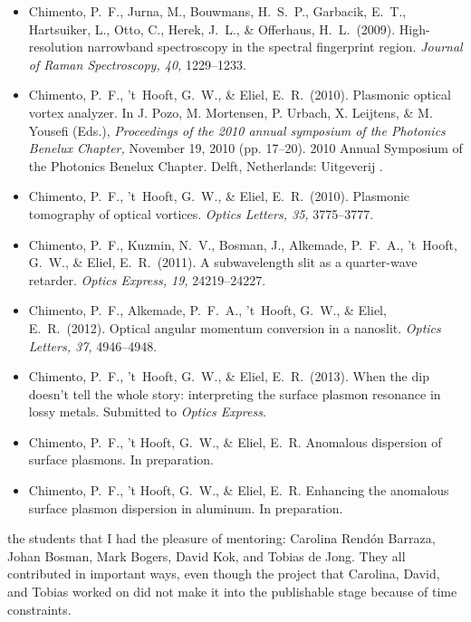 {\raggedright
\begin{itemize}
\item Chimento, P.~F., Jurna, M., Bouwmans, H.~S.~P., Garbacik, E.~T., Hartsuiker, L., Otto, C., Herek, J.~L., \& Offerhaus, H.~L.\ (2009). High-resolution narrowband  spectroscopy in the spectral fingerprint region. \emph{Journal of Raman Spectroscopy, 40,} 1229--1233.
\item Chimento, P.~F., 't~Hooft, G.~W., \& Eliel, E.~R.\ (2010). Plasmonic optical vortex analyzer. In J. Pozo, M. Mortensen, P. Urbach, X. Leijtens, \& M. Yousefi (Eds.), \emph{Proceedings of the 2010 annual symposium of the  Photonics Benelux Chapter,} November 19, 2010 (pp. 17--20). 2010 Annual Symposium of the  Photonics Benelux Chapter. Delft, Netherlands: Uitgeverij .
\item Chimento, P.~F., 't~Hooft, G.~W., \& Eliel, E.~R.\ (2010). Plasmonic tomography of optical vortices. \emph{Optics Letters, 35,} 3775--3777.
\item Chimento, P.~F., Kuzmin, N.~V., Bosman, J., Alkemade, P.~F.~A., 't~Hooft, G.~W., \& Eliel, E.~R.\ (2011). A subwavelength slit as a quarter-wave retarder. \emph{Optics Express, 19,} 24219--24227.
\item Chimento, P.~F., Alkemade, P.~F.~A., 't~Hooft, G.~W., \& Eliel, E.~R.\ (2012). Optical angular momentum conversion in a nanoslit. \emph{Optics Letters, 37,} 4946--4948.
\item Chimento, P.~F., 't~Hooft, G.~W., \& Eliel, E.~R.\ (2013). When the dip doesn't tell the whole story: interpreting the surface plasmon resonance in lossy metals. Submitted to \emph{Optics Express}.
\item Chimento, P.~F., 't Hooft, G.~W., \& Eliel, E.~R. Anomalous dispersion of surface plasmons. In preparation.
\item Chimento, P.~F., 't Hooft, G.~W., \& Eliel, E.~R. Enhancing the anomalous surface plasmon dispersion in aluminum. In preparation.
\end{itemize}
}


 the students that I had the pleasure of mentoring: Carolina Rend\'on Barraza, Johan Bosman, Mark Bogers, David Kok, and Tobias de Jong.
They all contributed in important ways, even though the project that Carolina, David, and Tobias worked on did not make it into the publishable stage because of time constraints.

